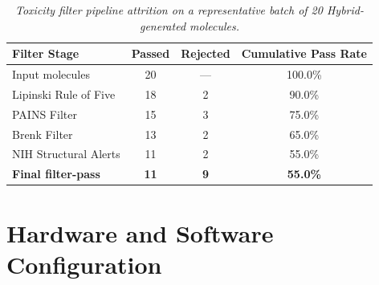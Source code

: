 \documentclass[12pt,a4paper]{report}
\begin{document}
\begin{table}[htbp]
\centering
\caption{\textit{Toxicity filter pipeline attrition on a representative batch of 20 Hybrid-generated molecules.}}
\label{tab:filter_output}
\renewcommand{\arraystretch}{1.1}
\begin{tabular}{lccc}
\hline
\textbf{Filter Stage}          & \textbf{Passed} & \textbf{Rejected} & \textbf{Cumulative Pass Rate} \\
\hline
Input molecules                & 20              & —                 & 100.0\% \\
Lipinski Rule of Five          & 18              & 2                 & 90.0\% \\
PAINS Filter                   & 15              & 3                 & 75.0\% \\
Brenk Filter                   & 13              & 2                 & 65.0\% \\
NIH Structural Alerts          & 11              & 2                 & 55.0\% \\
\hline
\textbf{Final filter-pass}     & \textbf{11}     & \textbf{9}        & \textbf{55.0\%} \\
\hline
\end{tabular}
\end{table}

\bigskip
\newpage


\section{Hardware and Software Configuration}
\end{document}
